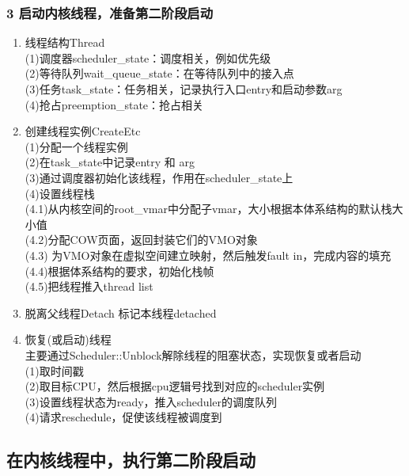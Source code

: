 \documentclass[
8pt, %
]{beamer}
\begin{document}
	\begin{frame}
		\frametitle{3 启动内核线程，准备第二阶段启动}
		\begin{enumerate}
			\item 线程结构Thread\\
			(1)调度器scheduler\_state：调度相关，例如优先级\\
			(2)等待队列wait\_queue\_state：在等待队列中的接入点\\
			(3)任务task\_state：任务相关，记录执行入口entry和启动参数arg\\
			(4)抢占preemption\_state：抢占相关\\
			\item 创建线程实例CreateEtc\\
			(1)分配一个线程实例\\
			(2)在task\_state中记录entry 和 arg\\
			(3)通过调度器初始化该线程，作用在scheduler\_state上\\
			(4)设置线程栈\\
			(4.1)从内核空间的root\_vmar中分配子vmar，大小根据本体系结构的默认栈大小值\\
			(4.2)分配COW页面，返回封装它们的VMO对象\\
			(4.3) 为VMO对象在虚拟空间建立映射，然后触发fault in，完成内容的填充\\
			(4.4)根据体系结构的要求，初始化栈帧\\
			(4.5)把线程推入thread list\\
			\item 脱离父线程Detach
			标记本线程detached
			\item 恢复(或启动)线程\\
			主要通过Scheduler::Unblock解除线程的阻塞状态，实现恢复或者启动\\
			(1)取时间戳\\
			(2)取目标CPU，然后根据cpu逻辑号找到对应的scheduler实例\\
			(3)设置线程状态为ready，推入scheduler的调度队列\\
			(4)请求reschedule，促使该线程被调度到
		\end{enumerate}
	\end{frame}

	\subsection{在内核线程中，执行第二阶段启动}
	
\end{document}

